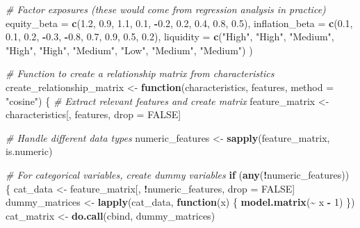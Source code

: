 \documentclass[
]{article}
\newenvironment{Shaded}{\begin{snugshade}}{\end{snugshade}}
\newcommand{\AttributeTok}[1]{\textcolor[rgb]{0.13,0.29,0.53}{#1}}
\newcommand{\CommentTok}[1]{\textcolor[rgb]{0.56,0.35,0.01}{\textit{#1}}}
\newcommand{\ConstantTok}[1]{\textcolor[rgb]{0.56,0.35,0.01}{#1}}
\newcommand{\ControlFlowTok}[1]{\textcolor[rgb]{0.13,0.29,0.53}{\textbf{#1}}}
\newcommand{\DecValTok}[1]{\textcolor[rgb]{0.00,0.00,0.81}{#1}}
\newcommand{\FloatTok}[1]{\textcolor[rgb]{0.00,0.00,0.81}{#1}}
\newcommand{\FunctionTok}[1]{\textcolor[rgb]{0.13,0.29,0.53}{\textbf{#1}}}
\newcommand{\NormalTok}[1]{#1}
\newcommand{\OtherTok}[1]{\textcolor[rgb]{0.56,0.35,0.01}{#1}}
\newcommand{\SpecialCharTok}[1]{\textcolor[rgb]{0.81,0.36,0.00}{\textbf{#1}}}
\newcommand{\StringTok}[1]{\textcolor[rgb]{0.31,0.60,0.02}{#1}}
\begin{document}
\begin{Shaded}
\begin{Highlighting}[]
  \CommentTok{\# Factor exposures (these would come from regression analysis in practice)}
  \AttributeTok{equity\_beta =} \FunctionTok{c}\NormalTok{(}\FloatTok{1.2}\NormalTok{, }\FloatTok{0.9}\NormalTok{, }\FloatTok{1.1}\NormalTok{, }\FloatTok{0.1}\NormalTok{, }\SpecialCharTok{{-}}\FloatTok{0.2}\NormalTok{, }\FloatTok{0.2}\NormalTok{, }\FloatTok{0.4}\NormalTok{, }\FloatTok{0.8}\NormalTok{, }\FloatTok{0.5}\NormalTok{),}
  \AttributeTok{inflation\_beta =} \FunctionTok{c}\NormalTok{(}\FloatTok{0.1}\NormalTok{, }\FloatTok{0.1}\NormalTok{, }\FloatTok{0.2}\NormalTok{, }\SpecialCharTok{{-}}\FloatTok{0.3}\NormalTok{, }\SpecialCharTok{{-}}\FloatTok{0.8}\NormalTok{, }\FloatTok{0.7}\NormalTok{, }\FloatTok{0.9}\NormalTok{, }\FloatTok{0.5}\NormalTok{, }\FloatTok{0.2}\NormalTok{),}
  \AttributeTok{liquidity =} \FunctionTok{c}\NormalTok{(}\StringTok{"High"}\NormalTok{, }\StringTok{"High"}\NormalTok{, }\StringTok{"Medium"}\NormalTok{, }\StringTok{"High"}\NormalTok{, }\StringTok{"High"}\NormalTok{, }
                \StringTok{"Medium"}\NormalTok{, }\StringTok{"Low"}\NormalTok{, }\StringTok{"Medium"}\NormalTok{, }\StringTok{"Medium"}\NormalTok{)}
\NormalTok{)}

\CommentTok{\# Function to create a relationship matrix from characteristics}
\NormalTok{create\_relationship\_matrix }\OtherTok{\textless{}{-}} \ControlFlowTok{function}\NormalTok{(characteristics, features, }\AttributeTok{method =} \StringTok{"cosine"}\NormalTok{) \{}
  \CommentTok{\# Extract relevant features and create matrix}
\NormalTok{  feature\_matrix }\OtherTok{\textless{}{-}}\NormalTok{ characteristics[, features, drop }\OtherTok{=} \ConstantTok{FALSE}\NormalTok{]}
  
  \CommentTok{\# Handle different data types}
\NormalTok{  numeric\_features }\OtherTok{\textless{}{-}} \FunctionTok{sapply}\NormalTok{(feature\_matrix, is.numeric)}
  
  \CommentTok{\# For categorical variables, create dummy variables}
  \ControlFlowTok{if}\NormalTok{ (}\FunctionTok{any}\NormalTok{(}\SpecialCharTok{!}\NormalTok{numeric\_features)) \{}
\NormalTok{    cat\_data }\OtherTok{\textless{}{-}}\NormalTok{ feature\_matrix[, }\SpecialCharTok{!}\NormalTok{numeric\_features, drop }\OtherTok{=} \ConstantTok{FALSE}\NormalTok{]}
\NormalTok{    dummy\_matrices }\OtherTok{\textless{}{-}} \FunctionTok{lapply}\NormalTok{(cat\_data, }\ControlFlowTok{function}\NormalTok{(x) \{}
      \FunctionTok{model.matrix}\NormalTok{(}\SpecialCharTok{\textasciitilde{}}\NormalTok{ x }\SpecialCharTok{{-}} \DecValTok{1}\NormalTok{)}
\NormalTok{    \})}
\NormalTok{    cat\_matrix }\OtherTok{\textless{}{-}} \FunctionTok{do.call}\NormalTok{(cbind, dummy\_matrices)}
    

\end{Highlighting}
\end{Shaded}
\end{document}
